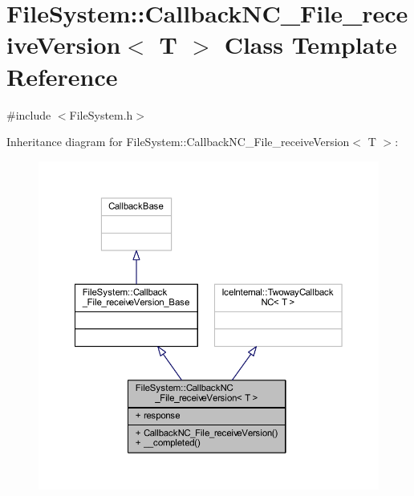 \hypertarget{class_file_system_1_1_callback_n_c___file__receive_version}{}\section{File\+System\+:\+:Callback\+N\+C\+\_\+\+File\+\_\+receive\+Version$<$ T $>$ Class Template Reference}
\label{class_file_system_1_1_callback_n_c___file__receive_version}


{\ttfamily \#include $<$File\+System.\+h$>$}



Inheritance diagram for File\+System\+:\+:Callback\+N\+C\+\_\+\+File\+\_\+receive\+Version$<$ T $>$\+:
\nopagebreak
\begin{figure}[H]
\begin{center}
\leavevmode
\includegraphics[width=350pt]{class_file_system_1_1_callback_n_c___file__receive_version__inherit__graph}
\end{center}
\end{figure}


